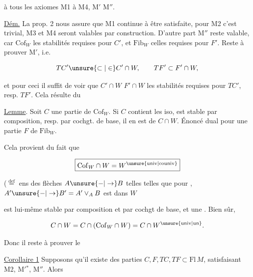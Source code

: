 


à tous les axiomes M1 à M4, M$'$ M$''$.

\uline{Dém.} La prop. 2 nous assure que M1 continue à être satisfaite,  pour M2 c'est trivial,  M3 et M4 seront valables par construction. D'autre part M$''$ reste valable, car $\mathrm{Cof}_W$  les stabilités requises pour $C'$, et $\mathrm{Fib}_W$ celles requises pour $F'$. Reste à prouver M$'$, i.e.

\[ TC'\unsure{\subset|\in} C'\cap W,\qquad TF'\subset F'\cap W, \]

et pour ceci il suffit de voir  que $C'\cap W$  $F'\cap W$  les stabilités requises pour $TC'$, resp. $TF'$. Cela résulte du

\uline{Lemme}. Soit $C$ une partie de $\mathrm{Cof}_W$. Si $C$ contient les iso,   est stable par composition, resp.  par cochgt. de base, il en est de \unsure{$=$} $C\cap W$. Énoncé dual pour une partie $F$ de $\mathrm{Fib}_W$.

Cela provient du fait que

\[ \boxed{\mathrm{Cof}_W\cap W=W^{\unsure{\mathrm{univ}|\mathrm{couniv}}}} \]


($\overset{\mathrm{def}}{=}$ ens des flèches $A\unsure{-|\to}B$ telles telles que pour  , $A'\unsure{-|\to}B'=A'\vee_A B$ est dans $W$

est lui-même stable par composition et par cochgt de base, et une  . Bien sûr, 

\[ C\cap W=C\cap(\mathrm{Cof}_W\cap W)=C\cap W^{\unsure{\mathrm{univ}|\mathrm{un}}}. \]




Donc il reste à prouver le

\uline{Corollaire  1} Supposons qu'il existe des parties $C,F,TC,TF\subset\mathrm{Fl}\,M$, satisfaisant  M2, M$'{}^{*}$, M$''$. Alors

